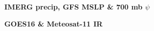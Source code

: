 \documentclass[aspectratio=169, 10pt]{beamer}
\begin{document}
\begin{frame}
\begin{columns}
\begin{column}{0.47\textwidth}
\begin{figure}
\end{figure}
\end{column}



\begin{column}{0.53\textwidth}
\vspace{-.47cm}
\begin{figure}
\textbf{IMERG precip, GFS MSLP \& 700 mb $\psi$}\\
\end{figure}
\vspace{-.15cm}
\begin{figure}
\vspace{-.45cm} \textbf{GOES16 \& Meteosat-11 IR}  \vspace{.1cm}\\

\end{figure}
\end{column}
\end{columns}
\end{frame}
\end{document}
